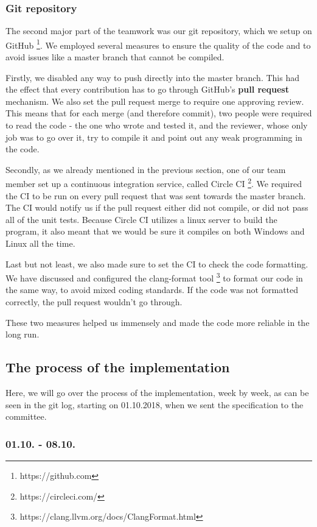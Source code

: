 \subsubsection{Git repository}
The second major part of the teamwork was our git repository, which we setup on GitHub \footnote{https://github.com}. We employed several measures to ensure the quality of the code and to avoid issues like a master branch that cannot be compiled.

Firstly, we disabled any way to push directly into the master branch. This had the effect that every contribution has to go through GitHub's \textbf{pull request} mechanism. We also set the pull request merge to require one approving review. This means that for each merge (and therefore commit), two people were required to read the code - the one who wrote and tested it, and the reviewer, whose only job was to go over it, try to compile it and point out any weak programming in the code.

Secondly, as we already mentioned in the previous section, one of our team member set up a continuous integration service, called Circle CI \footnote{https://circleci.com/}. We required the CI to be run on every pull request that was sent towards the master branch. The CI would notify us if the pull request either did not compile, or did not pass all of the unit tests. Because Circle CI utilizes a linux server to build the program, it also meant that we would be sure it compiles on both Windows and Linux all the time.

Last but not least, we also made sure to set the CI to check the code formatting. We have discussed and configured the clang-format tool \footnote{https://clang.llvm.org/docs/ClangFormat.html} to format our code in the same way, to avoid mixed coding standards. If the code was not formatted correctly, the pull request wouldn't go through.

These two measures helped us immensely and made the code more reliable in the long run.

\subsection{The process of the implementation}

Here, we will go over the process of the implementation, week by week, as can be seen in the git log, starting on 01.10.2018, when we sent the specification to the committee.

\subsubsection{01.10. - 08.10.}

